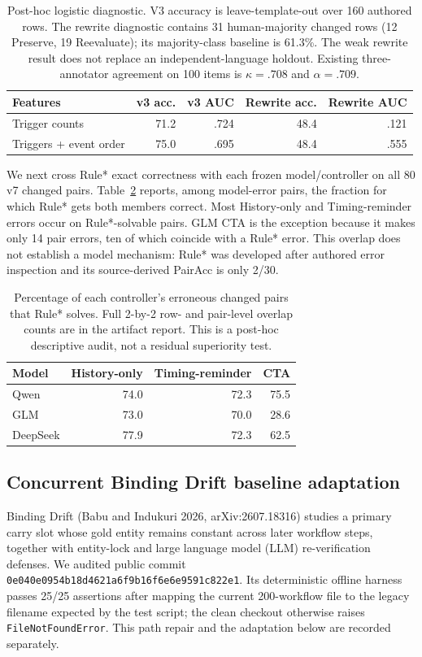 \documentclass[10pt]{article}
\begin{document}
\begin{table}[H]
\centering
\small
\begin{tabular}{lrrrr}
\toprule
Features & v3 acc. & v3 AUC & Rewrite acc. & Rewrite AUC \\
\midrule
Trigger counts & 71.2 & .724 & 48.4 & .121 \\
Triggers + event order & 75.0 & .695 & 48.4 & .555 \\
\bottomrule
\end{tabular}
\caption{Post-hoc logistic diagnostic. V3 accuracy is leave-template-out over 160 authored rows.
The rewrite diagnostic contains 31 human-majority changed rows (12 Preserve, 19 Reevaluate); its
majority-class baseline is 61.3\%. The weak rewrite result does not replace an independent-language
holdout. Existing three-annotator agreement on 100 items is $\kappa=.708$ and $\alpha=.709$.}
\label{tab:supp-trigger-logistic}
\end{table}

We next cross Rule* exact correctness with each frozen model/controller on all 80 v7 changed
pairs. Table~\ref{tab:supp-rule-model-overlap} reports, among model-error pairs, the fraction for
which Rule* gets both members correct. Most History-only and Timing-reminder errors occur on
Rule*-solvable pairs. GLM CTA is the exception because it makes only 14 pair errors, ten of which
coincide with a Rule* error. This overlap does not establish a model mechanism: Rule* was developed
after authored error inspection and its source-derived PairAcc is only 2/30.

\begin{table}[H]
\centering
\small
\begin{tabular}{lrrr}
\toprule
Model & History-only & Timing-reminder & CTA \\
\midrule
Qwen & 74.0 & 72.3 & 75.5 \\
GLM & 73.0 & 70.0 & 28.6 \\
DeepSeek & 77.9 & 72.3 & 62.5 \\
\bottomrule
\end{tabular}
\caption{Percentage of each controller's erroneous changed pairs that Rule* solves. Full 2-by-2
row- and pair-level overlap counts are in the artifact report. This is a post-hoc descriptive
audit, not a residual superiority test.}
\label{tab:supp-rule-model-overlap}
\end{table}

\subsection{Concurrent Binding Drift baseline adaptation}
Binding Drift (Babu and Indukuri 2026, arXiv:2607.18316) studies a primary carry slot whose gold
entity remains constant across later workflow steps, together with entity-lock and large language model (LLM)
re-verification defenses. We audited public commit
\texttt{0e040e0954b18d4621a6f9b16f6e6e9591c822e1}. Its deterministic offline harness passes
25/25 assertions after mapping the current 200-workflow file to the legacy filename expected by the
test script; the clean checkout otherwise raises \texttt{FileNotFoundError}. This path repair and
the adaptation below are recorded separately.
\end{document}
